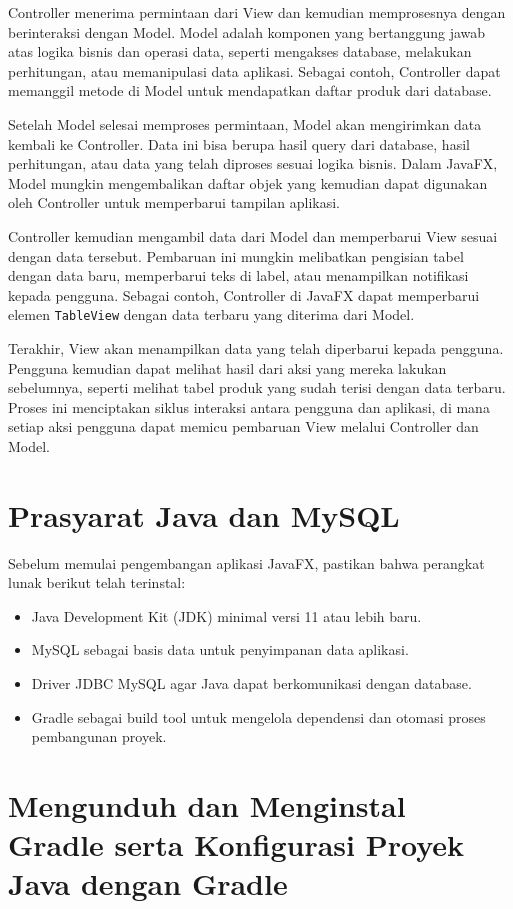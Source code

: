 Controller menerima permintaan dari View dan kemudian memprosesnya dengan berinteraksi dengan Model. Model adalah komponen yang bertanggung jawab atas logika bisnis dan operasi data, seperti mengakses database, melakukan perhitungan, atau memanipulasi data aplikasi. Sebagai contoh, Controller dapat memanggil metode di Model untuk mendapatkan daftar produk dari database.

Setelah Model selesai memproses permintaan, Model akan mengirimkan data kembali ke Controller. Data ini bisa berupa hasil query dari database, hasil perhitungan, atau data yang telah diproses sesuai logika bisnis. Dalam JavaFX, Model mungkin mengembalikan daftar objek yang kemudian dapat digunakan oleh Controller untuk memperbarui tampilan aplikasi.

Controller kemudian mengambil data dari Model dan memperbarui View sesuai dengan data tersebut. Pembaruan ini mungkin melibatkan pengisian tabel dengan data baru, memperbarui teks di label, atau menampilkan notifikasi kepada pengguna. Sebagai contoh, Controller di JavaFX dapat memperbarui elemen \texttt{TableView} dengan data terbaru yang diterima dari Model.

Terakhir, View akan menampilkan data yang telah diperbarui kepada pengguna. Pengguna kemudian dapat melihat hasil dari aksi yang mereka lakukan sebelumnya, seperti melihat tabel produk yang sudah terisi dengan data terbaru. Proses ini menciptakan siklus interaksi antara pengguna dan aplikasi, di mana setiap aksi pengguna dapat memicu pembaruan View melalui Controller dan Model.


\section{Prasyarat Java dan MySQL}
Sebelum memulai pengembangan aplikasi JavaFX, pastikan bahwa perangkat lunak berikut telah terinstal:

\begin{itemize}
	\item Java Development Kit (JDK) minimal versi 11 atau lebih baru.
	\item MySQL sebagai basis data untuk penyimpanan data aplikasi.
	\item Driver JDBC MySQL agar Java dapat berkomunikasi dengan database.
	\item Gradle sebagai build tool untuk mengelola dependensi dan otomasi proses pembangunan proyek.
\end{itemize}

\section{Mengunduh dan Menginstal Gradle serta Konfigurasi Proyek Java dengan Gradle}

